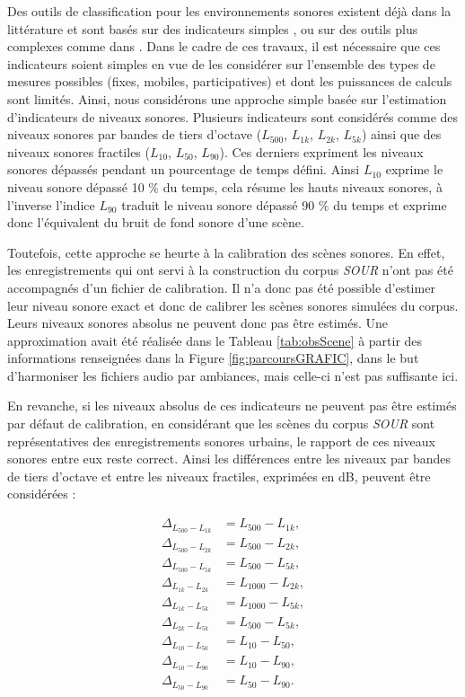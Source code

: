 Des outils de classification pour les environnements sonores existent déjà dans la littérature et sont basés sur des indicateurs simples \cite{can_describing_2015}, \cite{rychtarikova2013soundscape} ou sur des outils plus complexes comme dans \cite{salamon2015unsupervised}.
Dans le cadre de ces travaux, il est nécessaire que ces indicateurs soient simples en vue de les considérer sur l'ensemble des types de mesures possibles (fixes, mobiles, participatives) et dont les puissances de calculs sont limités. Ainsi, nous considérons une approche simple basée sur l'estimation d'indicateurs de niveaux sonores.
Plusieurs indicateurs sont considérés comme des niveaux sonores par bandes de tiers d'octave ($L_{500}$, $L_{1k}$, $L_{2k}$, $L_{5k}$) ainsi que des niveaux sonores fractiles ($L_{10}$, $L_{50}$, $L_{90}$). Ces derniers expriment les niveaux sonores dépassés pendant un pourcentage de temps défini. Ainsi $L_{10}$ exprime le niveau sonore dépassé 10 $\%$ du temps, cela résume les hauts niveaux sonores, à l'inverse l'indice $L_{90}$ traduit le niveau sonore dépassé 90 $\%$ du temps et exprime donc l'équivalent du bruit de fond sonore d'une scène.

Toutefois, cette approche se heurte à la calibration des scènes sonores. En effet, les enregistrements qui ont servi à la construction du corpus \textit{SOUR} n'ont pas été accompagnés d'un fichier de calibration. Il n'a donc pas été possible d'estimer leur niveau sonore exact et donc de calibrer les scènes sonores simulées du corpus. Leurs niveaux sonores absolus ne peuvent donc pas être estimés. Une approximation avait été réalisée dans le Tableau \ref{tab:obsScene} à partir des informations renseignées dans la Figure \ref{fig:parcoursGRAFIC}, dans le but d'harmoniser les fichiers audio par ambiances, mais celle-ci n'est pas suffisante ici.

En revanche, si les niveaux absolus de ces indicateurs ne peuvent pas être estimés par défaut de calibration, en considérant que les scènes du corpus \textit{SOUR} sont représentatives des enregistrements sonores urbains, le rapport de ces niveaux sonores entre eux reste correct. Ainsi les différences entre les niveaux par bandes de tiers d'octave et entre les niveaux fractiles, exprimées en dB, peuvent être considérées : 

\begin{subequations}\label{eq:delta_L}
\begin{align}
\Delta_{L_{500}-L_{1k}} &= L_{500}-L_{1k}, \\
\Delta_{L_{500}-L_{2k}} &= L_{500}-L_{2k}, \\
\Delta_{L_{500}-L_{5k}} &= L_{500}-L_{5k}, \\
\Delta_{L_{1k}-L_{2k}} &= L_{1000}-L_{2k}, \\
\Delta_{L_{1k}-L_{5k}} &= L_{1000}-L_{5k}, \\
\Delta_{L_{2k}-L_{5k}} &= L_{500}-L_{5k}, \\
\Delta_{L_{10}-L_{50}} &= L_{10}-L_{50}, \\
\Delta_{L_{10}-L_{90}} &= L_{10}-L_{90}, \\
\Delta_{L_{50}-L_{90}} &= L_{50}-L_{90}.
\end{align}
\end{subequations}

